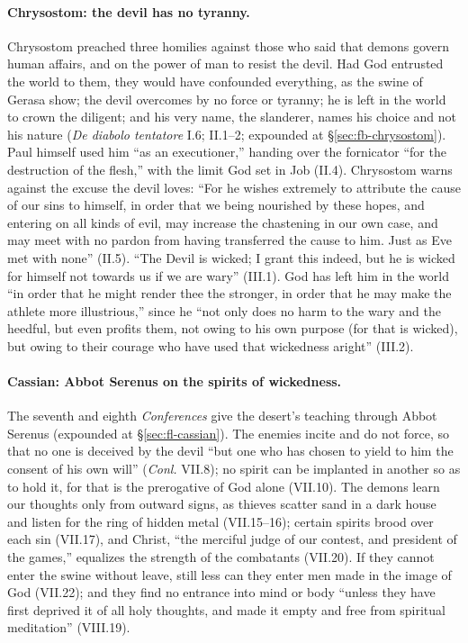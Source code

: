 \paragraph{Chrysostom: the devil has no tyranny.} Chrysostom preached three
homilies against those who said that demons govern human affairs, and on
the power of man to resist the devil. Had God entrusted the world to them,
they would have confounded everything, as the swine of Gerasa show; the
devil overcomes by no force or tyranny; he is left in the world to crown the
diligent; and his very name, the slanderer, names his choice and not his
nature (\emph{De diabolo tentatore} I.6; II.1--2; expounded at
\S\ref{sec:fb-chrysostom}). Paul himself used him ``as an executioner,''
handing over the fornicator ``for the destruction of the flesh,'' with the
limit God set in Job (II.4). Chrysostom warns against the excuse the devil
loves: ``For he wishes extremely to attribute the cause of our sins to
himself, in order that we being nourished by these hopes, and entering on
all kinds of evil, may increase the chastening in our own case, and may
meet with no pardon from having transferred the cause to him. Just as Eve
met with none'' (II.5). ``The Devil is wicked; I grant this indeed, but he
is wicked for himself not towards us if we are wary'' (III.1). God has left
him in the world ``in order that he might render thee the stronger, in
order that he may make the athlete more illustrious,'' since he ``not only
does no harm to the wary and the heedful, but even profits them, not owing
to his own purpose (for that is wicked), but owing to their courage who have
used that wickedness aright'' (III.2).

\paragraph{Cassian: Abbot Serenus on the spirits of wickedness.} The
seventh and eighth \emph{Conferences} give the desert's teaching through
Abbot Serenus (expounded at \S\ref{sec:fl-cassian}). The enemies incite and
do not force, so that no one is deceived by the devil ``but one who has
chosen to yield to him the consent of his own will'' (\emph{Conl.} VII.8);
no spirit can be implanted in another so as to hold it, for that is the
prerogative of God alone (VII.10). The demons learn our thoughts only from
outward signs, as thieves scatter sand in a dark house and listen for the
ring of hidden metal (VII.15--16); certain spirits brood over each sin
(VII.17), and Christ, ``the merciful judge of our contest, and president of
the games,'' equalizes the strength of the combatants (VII.20). If they
cannot enter the swine without leave, still less can they enter men made in
the image of God (VII.22); and they find no entrance into mind or body
``unless they have first deprived it of all holy thoughts, and made it empty
and free from spiritual meditation'' (VIII.19).


